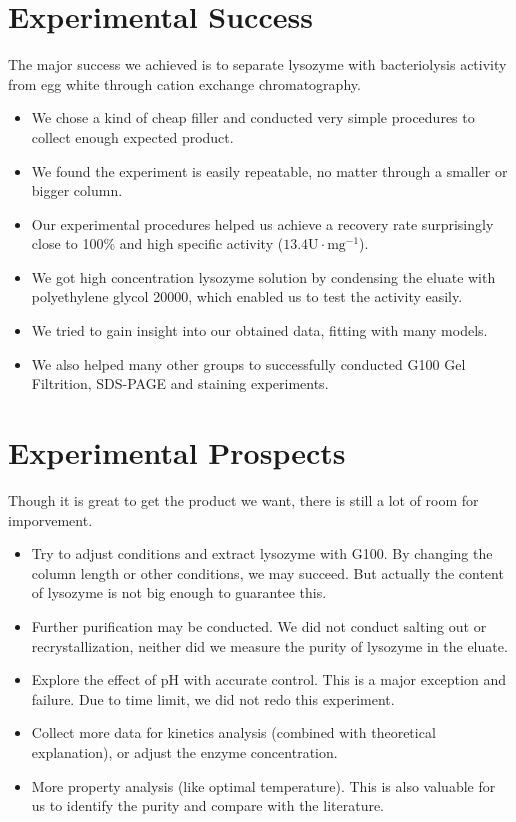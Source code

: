 \section{Experimental Success}
The major success we achieved is to separate lysozyme with bacteriolysis activity from egg white through cation exchange chromatography. 
\begin{itemize}
	\item We chose a kind of cheap filler and conducted very simple procedures to collect enough expected product. \item We found the experiment is easily repeatable, no matter through a smaller or bigger column.
	\item Our experimental procedures helped us achieve a recovery rate surprisingly close to 100\% and high specific activity ($13.4\mathrm{U\cdot mg^{-1}}$).
	\item We got high concentration lysozyme solution by condensing the eluate with polyethylene glycol 20000, which enabled us to test the activity easily.
	\item We tried to gain insight into our obtained data, fitting with many models.
	\item We also helped many other groups to successfully conducted G100 Gel Filtrition, SDS-PAGE and staining experiments.
\end{itemize} 

\section{Experimental Prospects}

Though it is great to get the product we want, there is still a lot of room for imporvement.
\begin{itemize}
	\item
	Try to adjust conditions and extract lysozyme with G100. By changing the column length or other conditions, we may succeed. But actually the content of lysozyme is not big enough to guarantee this.
	\item
	Further purification may be conducted. We did not conduct salting out or recrystallization, neither did we measure the purity of lysozyme in the eluate.
	\item
	Explore the effect of pH with accurate control. This is a major exception and failure. Due to time limit, we did not redo this experiment.
	\item
	Collect more data for kinetics analysis (combined with theoretical
	explanation), or adjust the enzyme concentration. 
	\item
	More property analysis (like optimal temperature). This is also
	valuable for us to identify the purity and compare with the
	literature.
\end{itemize}

